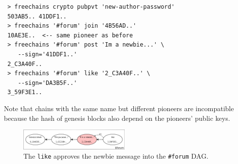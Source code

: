 \documentclass[10pt,journal,compsoc]{IEEEtran}
\begin{document}
{\footnotesize
\begin{verbatim}
 > freechains crypto pubpvt 'new-author-password'
 503AB5.. 41DDF1..
 > freechains '#forum' join '4B56AD..'
 10AE3E..  <-- same pioneer as before
 > freechains '#forum' post 'Im a newbie...' \
    --sign='41DDF1..'
 2_C3A40F..
 > freechains '#forum' like '2_C3A40F..' \
    --sign='DA3B5F..'
 3_59F3E1..
\end{verbatim}
}

Note that chains with the same name but different pioneers are incompatible
because the hash of genesis blocks also depend on the pioneers' public keys.

\begin{figure}
\centering
\includegraphics[width=0.49\textwidth]{forum.png}
\caption{
    The \texttt{like} approves the newbie message into the \texttt{\#forum} DAG.
}
\label{fig.forum}
\end{figure}
\end{document}
